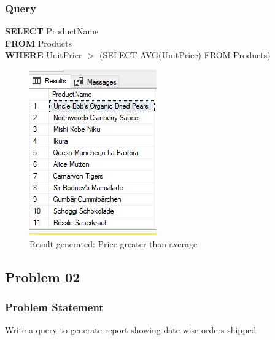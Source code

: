 \documentclass[12pt,a4paper]{report}
\begin{document}
\subsubsection{Query}
\begin{center}
	\begin{minipage}{12cm}
		\textbf{SELECT} ProductName \\
		\textbf{FROM} Products\\
		\textbf{WHERE} UnitPrice $>$ (SELECT AVG(UnitPrice) FROM Products) 
	\end{minipage}
	\begin{figure}[h]
	\centering
		\includegraphics[scale=0.7]{images/7.png}
		\caption{Result generated: Price greater than average}
	\end{figure}
\end{center}

\subsection{Problem 02}
\subsubsection{Problem Statement}
Write a query to generate report showing date wise orders shipped 
\end{document}
